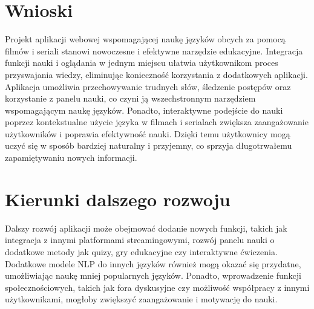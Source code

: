 
\section{Wnioski}
Projekt aplikacji webowej wspomagającej naukę języków obcych za pomocą filmów i seriali stanowi nowoczesne i efektywne narzędzie edukacyjne. Integracja funkcji nauki i oglądania w jednym miejscu ułatwia użytkownikom proces przyswajania wiedzy, eliminując konieczność korzystania z dodatkowych aplikacji. Aplikacja umożliwia przechowywanie trudnych słów, śledzenie postępów oraz korzystanie z panelu nauki, co czyni ją wszechstronnym narzędziem wspomagającym naukę języków. Ponadto, interaktywne podejście do nauki poprzez kontekstualne użycie języka w filmach i serialach zwiększa zaangażowanie użytkowników i poprawia efektywność nauki. Dzięki temu użytkownicy mogą uczyć się w sposób bardziej naturalny i przyjemny, co sprzyja długotrwałemu zapamiętywaniu nowych informacji.

\section{Kierunki dalszego rozwoju}
Dalszy rozwój aplikacji może obejmować dodanie nowych funkcji, takich jak integracja z innymi platformami streamingowymi, rozwój panelu nauki o dodatkowe metody jak quizy, gry edukacyjne czy interaktywne ćwiczenia. Dodatkowe modele NLP do innych języków również mogą okazać się przydatne, umożliwiając naukę mniej popularnych języków. Ponadto, wprowadzenie funkcji społecznościowych, takich jak fora dyskusyjne czy możliwość współpracy z innymi użytkownikami, mogłoby zwiększyć zaangażowanie i motywację do nauki.